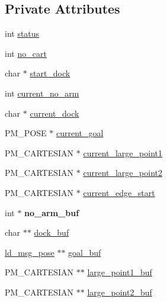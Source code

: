 \subsection*{Private Attributes}
\begin{DoxyCompactItemize}
\item 
int \mbox{\hyperlink{classcart__status_a641a53bcd134b03c70ddbad2309f3e1c}{status}}
\item 
int \mbox{\hyperlink{classcart__status_a7ddb73db75439f687289c32c3e10d625}{no\+\_\+cart}}
\item 
char $\ast$ \mbox{\hyperlink{classcart__status_a6581ba4998e76807e8837f317ff5630f}{start\+\_\+dock}}
\item 
int \mbox{\hyperlink{classcart__status_ad458c08316b2199cbfbe0e1186585432}{current\+\_\+no\+\_\+arm}}
\item 
char $\ast$ \mbox{\hyperlink{classcart__status_abee50a181916299e573abd0507fcba47}{current\+\_\+dock}}
\item 
P\+M\+\_\+\+P\+O\+SE $\ast$ \mbox{\hyperlink{classcart__status_aa6c952cba3af2fd3ad9c67567ecf419d}{current\+\_\+goal}}
\item 
P\+M\+\_\+\+C\+A\+R\+T\+E\+S\+I\+AN $\ast$ \mbox{\hyperlink{classcart__status_ab8c619198ba84c252a3740d2271f530e}{current\+\_\+large\+\_\+point1}}
\item 
P\+M\+\_\+\+C\+A\+R\+T\+E\+S\+I\+AN $\ast$ \mbox{\hyperlink{classcart__status_ab17505f9587a0b7c6d3111a8a1d38080}{current\+\_\+large\+\_\+point2}}
\item 
P\+M\+\_\+\+C\+A\+R\+T\+E\+S\+I\+AN $\ast$ \mbox{\hyperlink{classcart__status_aad004440fb11b544f0bd692ec6d2230a}{current\+\_\+edge\+\_\+start}}
\item 
\mbox{\label{classcart__status_aa7dcfbd13720f8fb6b475174ab72ea3a}} 
int $\ast$ {\bfseries no\+\_\+arm\+\_\+buf}
\item 
char $\ast$$\ast$ \mbox{\hyperlink{classcart__status_a8f3151213022c1aab59d0c0dae5e4b4c}{dock\+\_\+buf}}
\item 
\mbox{\hyperlink{structld__msg__pose}{ld\+\_\+msg\+\_\+pose}} $\ast$$\ast$ \mbox{\hyperlink{classcart__status_a4912ff0b77258f77f4f7c118ad8345c7}{goal\+\_\+buf}}
\item 
P\+M\+\_\+\+C\+A\+R\+T\+E\+S\+I\+AN $\ast$$\ast$ \mbox{\hyperlink{classcart__status_ab22c188f57ded9039c5bf65b56d14967}{large\+\_\+point1\+\_\+buf}}
\item 
P\+M\+\_\+\+C\+A\+R\+T\+E\+S\+I\+AN $\ast$$\ast$ \mbox{\hyperlink{classcart__status_aff6cd4f5352a807b290381b103d1fa7a}{large\+\_\+point2\+\_\+buf}}

\end{DoxyCompactItemize}
